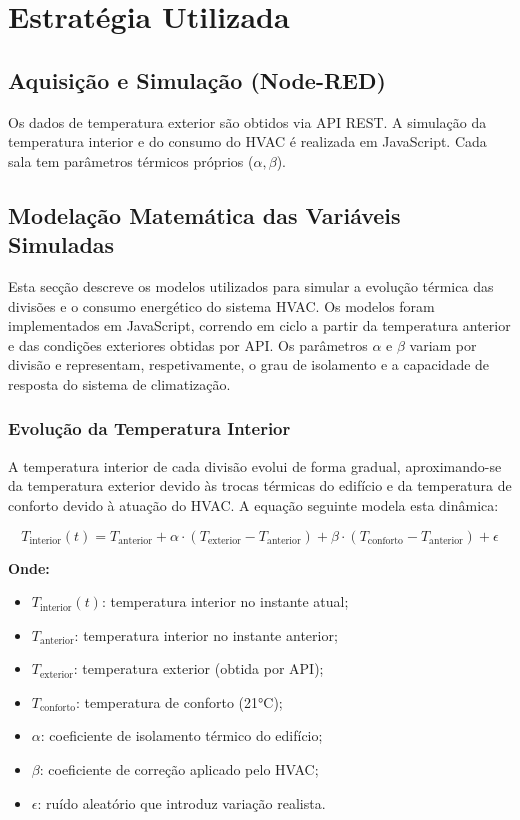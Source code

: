\documentclass[a4paper, 12pt]{article} %
\begin{document}

\newpage
\section{Estratégia Utilizada}

\subsection{Aquisição e Simulação (Node-RED)}

Os dados de temperatura exterior são obtidos via API REST.  
A simulação da temperatura interior e do consumo do HVAC é realizada em JavaScript.
Cada sala tem parâmetros térmicos próprios (\(\alpha, \beta\)).
\subsection{Modelação Matemática das Variáveis Simuladas}

Esta secção descreve os modelos utilizados para simular a evolução térmica das divisões e o consumo energético do sistema HVAC.  
Os modelos foram implementados em JavaScript, correndo em ciclo a partir da temperatura anterior e das condições exteriores obtidas por API.  
Os parâmetros $\alpha$ e $\beta$ variam por divisão e representam, respetivamente, o grau de isolamento e a capacidade de resposta do sistema de climatização.

\subsubsection*{Evolução da Temperatura Interior}

A temperatura interior de cada divisão evolui de forma gradual, aproximando-se da temperatura exterior devido às trocas térmicas do edifício e da temperatura de conforto devido à atuação do HVAC.
A equação seguinte modela esta dinâmica:

\[
T_{\text{interior}}(t) = T_{\text{anterior}} + \alpha \cdot (T_{\text{exterior}} - T_{\text{anterior}}) + \beta \cdot (T_{\text{conforto}} - T_{\text{anterior}}) + \epsilon
\]

\textbf{Onde:}
\begin{itemize}[nosep]
	\item $T_{\text{interior}}(t)$: temperatura interior no instante atual;
	\item $T_{\text{anterior}}$: temperatura interior no instante anterior;
	\item $T_{\text{exterior}}$: temperatura exterior (obtida por API);
	\item $T_{\text{conforto}}$: temperatura de conforto (21°C);
	\item $\alpha$: coeficiente de isolamento térmico do edifício;
	\item $\beta$: coeficiente de correção aplicado pelo HVAC;
	\item $\epsilon$: ruído aleatório que introduz variação realista.\\
\end{itemize}
\end{document}

